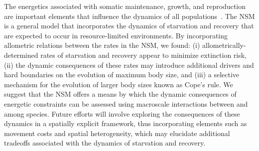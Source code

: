 \documentclass[twocolumn,preprintnumbers,amsmath,amssymb,superscriptaddress]{revtex4}
\begin{document}

The energetics associated with somatic maintenance, growth, and reproduction are important elements that influence the dynamics of all populations~\citep{Stearns:1989ip}.
The NSM is a general model that incorporates the dynamics of starvation and recovery that are expected to occur in resource-limited environments.
By incorporating allometric relations between the rates in the NSM, we found: (i) allometrically-determined rates of starvation and recovery appear to minimize extinction risk, (ii) the dynamic consequences of these rates may introduce additional drivers and hard boundaries on the evolution of maximum body size, and (iii) a selective mechanism for the evolution of larger body sizes known as Cope's rule.
We suggest that the NSM offers a means by which the dynamic consequences of energetic constraints can be assessed using macroscale interactions between and among species.
Future efforts will involve exploring the consequences of these dynamics in a spatially explicit framework, thus incorporating elements such as movement costs and spatial heterogeneity, which may elucidate additional tradeoffs associated with the dynamics of starvation and recovery.
\end{document}
